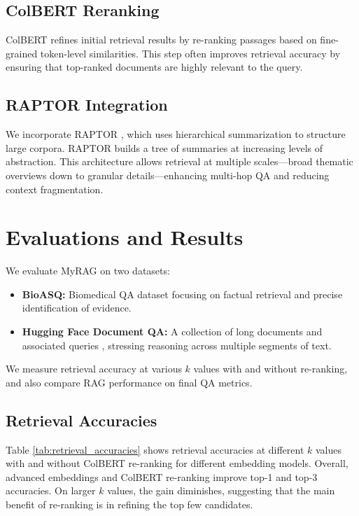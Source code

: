\documentclass{scrartcl}
\begin{document}
\subsection{ColBERT Reranking}

ColBERT \cite{khattab2020colbert} refines initial retrieval results by re-ranking passages based on fine-grained token-level similarities. This step often improves retrieval accuracy by ensuring that top-ranked documents are highly relevant to the query.

\subsection{RAPTOR Integration}

We incorporate RAPTOR \cite{wu2021recursively, raptor2024}, which uses hierarchical summarization to structure large corpora. RAPTOR builds a tree of summaries at increasing levels of abstraction. This architecture allows retrieval at multiple scales—broad thematic overviews down to granular details—enhancing multi-hop QA and reducing context fragmentation.

\section{Evaluations and Results}

We evaluate MyRAG on two datasets:
\begin{itemize}
    \item \textbf{BioASQ:} Biomedical QA dataset \cite{bioasq2023} focusing on factual retrieval and precise identification of evidence.
    \item \textbf{Hugging Face Document QA:} A collection of long documents and associated queries \cite{huggingface2024docqa}, stressing reasoning across multiple segments of text.
\end{itemize}

We measure retrieval accuracy at various $k$ values with and without re-ranking, and also compare RAG performance on final QA metrics.

\subsection{Retrieval Accuracies}

Table \ref{tab:retrieval_accuracies} shows retrieval accuracies at different $k$ values with and without ColBERT re-ranking for different embedding models. Overall, advanced embeddings and ColBERT re-ranking improve top-1 and top-3 accuracies. On larger $k$ values, the gain diminishes, suggesting that the main benefit of re-ranking is in refining the top few candidates.
\end{document}
